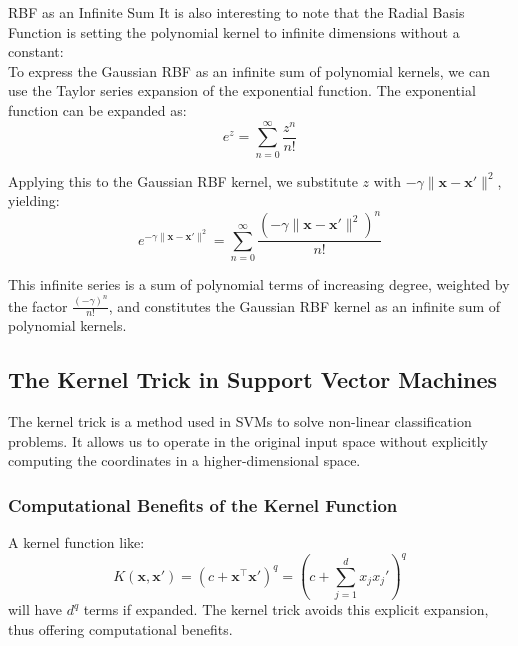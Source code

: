 \begin{sidenotebox}{RBF as an Infinite Sum}
    It is also interesting to note that the Radial Basis Function is setting the polynomial kernel to infinite dimensions without a constant:\\

To express the Gaussian RBF as an infinite sum of polynomial kernels, we can use the Taylor series expansion of the exponential function. The exponential function can be expanded as:
\begin{equation*}
e^z = \sum_{n=0}^{\infty} \frac{z^n}{n!}
\end{equation*}

Applying this to the Gaussian RBF kernel, we substitute \( z \) with \( -\gamma \|\mathbf{x} - \mathbf{x}'\|^2 \), yielding:
\begin{equation*}
e^{-\gamma \|\mathbf{x} - \mathbf{x}'\|^2} = \sum_{n=0}^{\infty} \frac{(-\gamma \|\mathbf{x} - \mathbf{x}'\|^2)^n}{n!}
\end{equation*}

This infinite series is a sum of polynomial terms of increasing degree, weighted by the factor \( \frac{(-\gamma)^n}{n!} \), and constitutes the Gaussian RBF kernel as an infinite sum of polynomial kernels.

\end{sidenotebox}

\subsection{The Kernel Trick in Support Vector Machines}

The kernel trick is a method used in SVMs to solve non-linear classification problems. It allows us to operate in the original input space without explicitly computing the coordinates in a higher-dimensional space.


\subsubsection*{Computational Benefits of the Kernel Function}
A kernel function like:
\begin{equation*}
K(\mathbf{x}, \mathbf{x}') = (c + \mathbf{x}^\top \mathbf{x}')^q = \left( c + \sum_{j=1}^{d} x_j x_j' \right)^q
\end{equation*}
will have \( d^q \) terms if expanded. The kernel trick avoids this explicit expansion, thus offering computational benefits.

